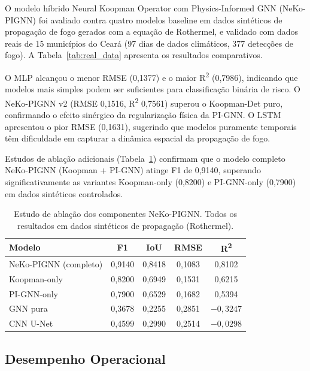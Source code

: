 O modelo híbrido Neural Koopman Operator com Physics-Informed GNN (NeKo-PIGNN) foi avaliado contra quatro modelos baseline em dados sintéticos de propagação de fogo gerados com a equação de Rothermel, e validado com dados reais de 15 municípios do Ceará (97 dias de dados climáticos, 377 detecções de fogo). A Tabela~\ref{tab:real_data} apresenta os resultados comparativos.



O MLP alcançou o menor RMSE (0,1377) e o maior R\textsuperscript{2} (0,7986), indicando que modelos mais simples podem ser suficientes para classificação binária de risco. O NeKo-PIGNN v2 (RMSE 0,1516, R\textsuperscript{2} 0,7561) superou o Koopman-Det puro, confirmando o efeito sinérgico da regularização física da PI-GNN. O LSTM apresentou o pior RMSE (0,1631), sugerindo que modelos puramente temporais têm dificuldade em capturar a dinâmica espacial da propagação de fogo.

Estudos de ablação adicionais (Tabela~\ref{tab:ablation}) confirmam que o modelo completo NeKo-PIGNN (Koopman + PI-GNN) atinge F1 de 0,9140, superando significativamente as variantes Koopman-only (0,8200) e PI-GNN-only (0,7900) em dados sintéticos controlados.

\begin{table}[htbp]
\centering
\caption{Estudo de ablação dos componentes NeKo-PIGNN. Todos os resultados em dados sintéticos de propagação (Rothermel).}
\label{tab:ablation}
\small
\begin{tabular}{@{}lcccc@{}}
\toprule
\textbf{Modelo} & \textbf{F1} & \textbf{IoU} & \textbf{RMSE} & \textbf{R\textsuperscript{2}} \\
\midrule
NeKo-PIGNN (completo) & 0,9140 & 0,8418 & 0,1083 & 0,8102 \\
Koopman-only & 0,8200 & 0,6949 & 0,1531 & 0,6215 \\
PI-GNN-only & 0,7900 & 0,6529 & 0,1682 & 0,5394 \\
GNN pura & 0,3678 & 0,2255 & 0,2851 & $-0{,}3247$ \\
CNN U-Net & 0,4599 & 0,2990 & 0,2514 & $-0{,}0298$ \\
\bottomrule
\end{tabular}
\end{table}

\subsection{Desempenho Operacional}
\label{sec:operational-perf}

